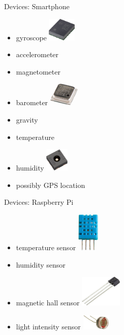 \documentclass[aspectratio=1610]{beamer}
\begin{document}
  \begin{frame}{Devices: Smartphone}
    \begin{itemize}
      \item gyroscope
            \hspace*{2em}
            \includegraphics[align=c,height=3em]{bmi160-sensor}
      \item accelerometer
      \item magnetometer
      \item barometer
            \hspace*{2em}
            \includegraphics[align=c,height=3em]{barometric-sensor}
      \item gravity
      \item temperature
      \item humidity
            \hspace*{2em}
            \includegraphics[align=c,height=3em]{shtc3-humidity-sensor}
      \item possibly GPS location
    \end{itemize}
  \end{frame}

  \begin{frame}{Devices: Raspberry Pi}
    \begin{itemize}
      \item temperature sensor
            \hspace*{2em}
            \includegraphics[align=c,height=5em]{dht11-sensor}
      \item humidity sensor
      \item magnetic hall sensor
            \hspace*{2em}
            \includegraphics[align=c,height=4em]{hall-sensor}
      \item light intensity sensor
            \hspace*{2em}
            \includegraphics[align=c,height=2em]{light-sensor}
    \end{itemize}
  \end{frame}
\end{document}
